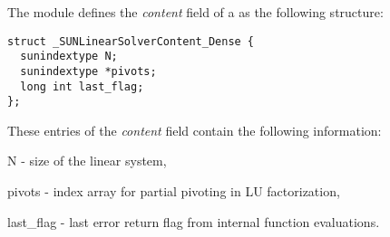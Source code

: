 The {\sunlinsollapdense} module defines the \textit{content} field of a
 as the following structure:
\begin{verbatim} 
struct _SUNLinearSolverContent_Dense {
  sunindextype N;
  sunindextype *pivots;
  long int last_flag;
};
\end{verbatim}
These entries of the \emph{content} field contain the following
information:
\begin{args}
  \item[N] - size of the linear system,
  \item[pivots] - index array for partial pivoting in LU factorization,
  \item[last\_flag] - last error return flag from internal function evaluations.
\end{args}


